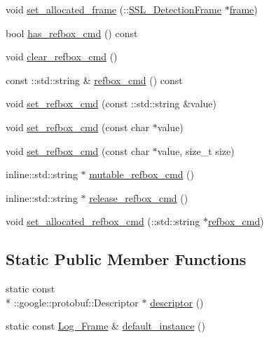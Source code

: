 \begin{DoxyCompactItemize}
\item 
void \hyperlink{class_log___frame_a1956cc38868fb3faab6088691054b8e2}{set\-\_\-allocated\-\_\-frame} (\-::\hyperlink{class_s_s_l___detection_frame}{S\-S\-L\-\_\-\-Detection\-Frame} $\ast$\hyperlink{class_log___frame_a051fb92f154ef0d775e191a99d2fef06}{frame})
\item 
bool \hyperlink{class_log___frame_ac86fc7db38caafb8a48363479cd5291a}{has\-\_\-refbox\-\_\-cmd} () const 
\item 
void \hyperlink{class_log___frame_aef3eecbd52c85f95fef6c096fab5700d}{clear\-\_\-refbox\-\_\-cmd} ()
\item 
const \-::std\-::string \& \hyperlink{class_log___frame_a8338687dbb56f928cf421ce8ba53d67c}{refbox\-\_\-cmd} () const 
\item 
void \hyperlink{class_log___frame_aa30d745c17b5df54f5c128dc12a5309c}{set\-\_\-refbox\-\_\-cmd} (const \-::std\-::string \&value)
\item 
void \hyperlink{class_log___frame_a852a91d42cf12f86aaf13ff77b54c9f0}{set\-\_\-refbox\-\_\-cmd} (const char $\ast$value)
\item 
void \hyperlink{class_log___frame_aba66b490df7a5c37917f6bb867264124}{set\-\_\-refbox\-\_\-cmd} (const char $\ast$value, size\-\_\-t size)
\item 
inline\-::std\-::string $\ast$ \hyperlink{class_log___frame_a5011f1a8f88ff3c67d24f60ed4fa0453}{mutable\-\_\-refbox\-\_\-cmd} ()
\item 
inline\-::std\-::string $\ast$ \hyperlink{class_log___frame_ae68f0713ef23bfc5f75e45d291751ce8}{release\-\_\-refbox\-\_\-cmd} ()
\item 
void \hyperlink{class_log___frame_a2e816936010780c6a24a8a183e6b9018}{set\-\_\-allocated\-\_\-refbox\-\_\-cmd} (\-::std\-::string $\ast$\hyperlink{class_log___frame_a8338687dbb56f928cf421ce8ba53d67c}{refbox\-\_\-cmd})
\end{DoxyCompactItemize}
\subsection*{Static Public Member Functions}
\begin{DoxyCompactItemize}
\item 
static const \\*
\-::google\-::protobuf\-::\-Descriptor $\ast$ \hyperlink{class_log___frame_a779be7c13504644652f6bbf87f57de88}{descriptor} ()
\item 
static const \hyperlink{class_log___frame}{Log\-\_\-\-Frame} \& \hyperlink{class_log___frame_a354dde04724294a61e0dd056e1b7b2a4}{default\-\_\-instance} ()
\end{DoxyCompactItemize}
